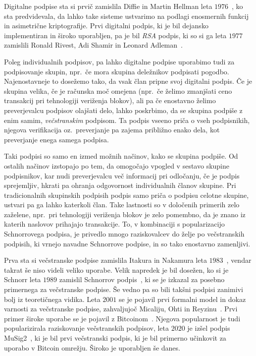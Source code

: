 \documentclass[isrm2, tisk]{fmfdelo}
\begin{document}
Digitalne podpise sta si prvič zamislila Diffie in Martin Hellman leta $1976$~\cite{diffie1976new},
ko sta predvidevala, da lahko take sisteme ustvarimo na podlagi enosmernih funkcij in asimetrične
kriptografije. Prvi digitalni podpis, ki je bil dejansko implementiran in široko uporabljen, pa je
bil \textit{RSA} podpis, ki so si ga leta $1977$ zamislili Ronald Rivest, Adi Shamir in Leonard
Adleman~\cite{rivest1978rsa}.

Poleg individualnih podpisov, pa lahko digitalne podpise uporabimo tudi za podpisovanje skupin, npr.\
če mora skupina deležnikov podpisati pogodbo. Najenostavneje to dosežemo tako, da vsak član pripne
svoj digitalni podpis. Če je skupina velika, če je računska moč omejena (npr.\ če želimo zmanjšati
ceno transakcij pri tehnologiji veriženja blokov), ali pa če enostavno želimo preverjevalcu podpisov
olajšati delo, lahko poskrbimo, da se skupina podpiše z enim samim, \textit{večstranskim} podpisom.
Ta podpis vseeno priča o vseh podpisnikih, njegova verifikacija oz.\ preverjanje pa zajema približno
enako dela, kot preverjanje enega samega podpisa.

Taki podpisi so samo en izmed možnih načinov, kako se skupina podpiše. Od ostalih načinov izstopajo
po tem, da omogočajo vpogled v sestavo skupine podpisnikov, kar nudi preverjevalcu več informacij
pri odločanju, če je podpis sprejemljiv, hkrati pa ohranja odgovornost individualnih članov skupine.
Pri tradicionalnih skupinskih podpisih podpis samo priča o podpisu celotne skupine, ustvari pa ga
lahko katerkoli član. Take lastnosti so v določenih primerih zelo zaželene, npr.\ pri tehnologiji
veriženja blokov je zelo pomembno, da je znano iz katerih naslovov prihajajo transakcije. To, v
kombinaciji s popularizacijo Schnorrovega podpisa, je privedlo mnogo raziskovalcev do želje po
večstranskih podpisih, ki vrnejo navadne Schnorrove podpise, in so tako enostavno zamenljivi.

Prva sta si večstranske podpise zamislila Itakura in Nakamura leta $1983$~\cite{itakura1983multi},
vendar takrat še niso videli veliko uporabe. Velik napredek je bil dosežen, ko si je Schnorr leta
$1989$ zamislil Schnorrov podpis~\cite{schnorr1989sig}, ki se je izkazal za posebno primernega za
večstranske podpise. Še vedno pa so bili takšni podpisi zanimivi bolj iz teoretičnega vidika. Leta
$2001$ se je pojavil prvi formalni model in dokaz varnosti za večstranske podpise, zahvaljujoč
Micaliju, Ohti in Reyzinu~\cite{micali2001asm}. Prvi primer široke uporabe se je pojavil z
Bitcoinom~\cite{nakamoto2009bitcoin}. Njegova popularnost je tudi popularizirala raziskovanje
večstranskih podpisov, leta $2020$ je izšel podpis MuSig2~\cite{jonas2020musig2}, ki je bil prvi
večstranski podpis, ki je bil primerno učinkovit za uporabo v Bitcoin omrežju. Široko je uporabljen
še danes.
\end{document}
